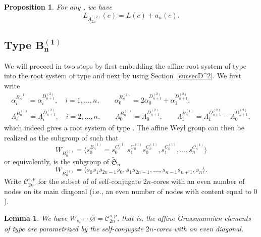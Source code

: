 \documentclass[pdftex]{sigma}
\newtheorem{Lemma}[Theorem]{Lemma}
\newtheorem{Proposition}[Theorem]{Proposition}
 { \theoremstyle{definition}
\newtheorem{Definition}[Theorem]{Definition}
\newtheorem{Note}[Theorem]{Note}
\newtheorem{Example}[Theorem]{Example}
\newtheorem{Remark}[Theorem]{Remark} }
\numberwithin{equation}{section}
\begin{document}
\begin{Proposition}
	\label{Prop_A(2n,2)prime} For any , we have
	\begin{equation*}
	L_{A_{2n}^{\prime (2)}}(c)=L(c)+a_{n}(c).
	\end{equation*}
\end{Proposition}

\subsection[Type B\_n\^{}(1)]{Type $\boldsymbol{B_{n}^{(1)}}$}

We will proceed in two steps by first embedding the affine root system of
type  into the root system of type  and next by
using Section~\ref{sucsecD^2}. We first write%
\begin{gather}
\alpha _{i}^{B_{n}^{(1)}}=\alpha _{i}^{D_{n+1}^{(2)}},\quad i=1,\dots ,n, \qquad
\alpha _{0}^{B_{n}^{(1)}}=2\alpha _{0}^{D_{n+1}^{(2)}}+\alpha
_{1}^{D_{n+1}^{(2)}},\nonumber\\
\Lambda _{i}^{B_{n}^{(1)}}=\Lambda _{i}^{D_{n+1}^{(2)}},\quad i=2,\dots ,n, \qquad
\Lambda _{0}^{B_{n}^{(1)}}=\Lambda _{0}^{D_{n+1}^{(2)}}, \qquad
\Lambda _{1}^{B_{n}^{(1)}}=\Lambda _{1}^{D_{n+1}^{(2)}}-\Lambda
_{0}^{D_{n+1}^{(2)}},
  \label{RelBA}
\end{gather}%
which indeed gives a root system of type . The affine Weyl
group  can then be realized as the subgroup of  such that
\begin{equation*}
W_{B_{n}^{(1)}}=\bigl\langle
s_{0}^{B_{n}^{(1)}}=s_{0}^{C_{n}^{(1)}}s_{1}^{C_{n}^{(1)}}s_{0}^{C_{n}^{(1)}},s_{1}^{C_{n}^{(1)}},\dots ,s_{n}^{C_{n}^{(1)}}\bigr\rangle
\end{equation*}%
or equivalently,  is the subgroup of $\widetilde{\mathfrak{S%
}}_{n}$%
\begin{equation*}
W_{B_{n}^{(1)}}=\langle s_{0}s_{1}s_{2n-1}s_{0},s_{1}s_{2n-1},\dots
,s_{n-1}s_{n+1},s_{n}\rangle .
\end{equation*}%
Write $\mathcal{C}_{2n}^{s,p}$ for the subset of  of
self-conjugate $2n$-cores with an even number of nodes on its main diagonal
(i.e., an even number of nodes with content equal to $0$).

\begin{Lemma}
	We have $W_{^{B_{n}^{(1)}}}\cdot \varnothing =\mathcal{C}_{2n}^{s,p}$, that is,
	the affine Grassmannian elements of type  are parametrized by
	the self-conjugate $2n$-cores with an even diagonal.
\end{Lemma}
\end{document}
